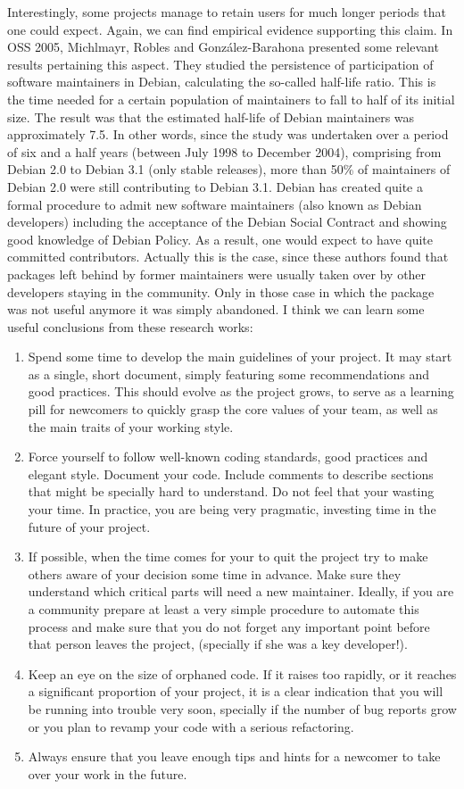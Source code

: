 Interestingly, some projects manage to retain users for much longer periods that one could expect. Again, we can find empirical evidence supporting this claim. In OSS 2005, Michlmayr, Robles and González-Barahona presented some relevant results pertaining this aspect. They studied the persistence of participation of software maintainers in Debian, calculating the so-called half-life ratio. This is the time needed for a certain population of maintainers to fall to half of its initial size. The result was that the estimated half-life of Debian maintainers was approximately 7.5. In other words, since the study was undertaken over a period of six and a half years (between July 1998 to December 2004), comprising from Debian 2.0 to Debian 3.1 (only stable releases), more than 50\% of maintainers of Debian 2.0 were still contributing to Debian 3.1.
Debian has created quite a formal procedure to admit new software maintainers (also known as Debian developers) including the acceptance of the Debian Social Contract and showing good knowledge of Debian Policy. As a result, one would expect to have quite committed contributors. Actually this is the case, since these authors found that packages left behind by former maintainers were usually taken over by other developers staying in the community. Only in those case in which the package was not useful anymore it was simply abandoned.
I think we can learn some useful conclusions from these research works:
\begin{enumerate}
 \item Spend some time to develop the main guidelines of your project. It may start as a single, short document, simply featuring some recommendations and good practices. This should evolve as the project grows, to serve as a learning pill for newcomers to quickly grasp the core values of your team, as well as the main traits of your working style.
 \item Force yourself to follow well-known coding standards, good practices and elegant style. Document your code. Include comments to describe sections that might be specially hard to understand. Do not feel that your wasting your time. In practice, you are being very pragmatic, investing time in the future of your project.
 \item If possible, when the time comes for your to quit the project try to make others aware of your decision some time in advance. Make sure they understand which critical parts will need a new maintainer. Ideally, if you are a community prepare at least a very simple procedure to automate this process and make sure that you do not forget any important point before that person leaves the project, (specially if she was a key developer!).
 \item Keep an eye on the size of orphaned code. If it raises too rapidly, or it reaches a significant proportion of your project, it is a clear indication that you will be running into trouble very soon, specially if the number of bug reports grow or you plan to revamp your code with a serious refactoring.
 \item Always ensure that you leave enough tips and hints for a newcomer to take over your work in the future.
\end{enumerate}

